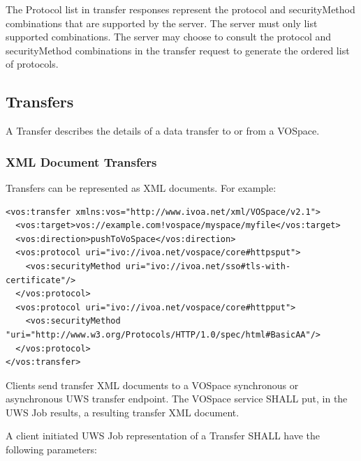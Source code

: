 \documentclass[11pt,a4paper]{ivoa}
\begin{document}
The Protocol list in transfer responses represent the protocol and securityMethod combinations that are supported by the server.  The server must only list supported combinations.  The server may choose to consult the protocol and securityMethod combinations in the transfer request to generate the ordered list of protocols.

\subsection{Transfers}
\label{subsec:transfers}
A Transfer describes the details of a data transfer to or from a VOSpace.

\subsubsection{XML Document Transfers}
\label{subsubsec:xml document transfers}

Transfers can be represented as XML documents.  For example:

\begin{verbatim}
<vos:transfer xmlns:vos="http://www.ivoa.net/xml/VOSpace/v2.1">
  <vos:target>vos://example.com!vospace/myspace/myfile</vos:target>
  <vos:direction>pushToVoSpace</vos:direction>
  <vos:protocol uri="ivo://ivoa.net/vospace/core#httpsput">
    <vos:securityMethod uri="ivo://ivoa.net/sso#tls-with-certificate"/>
  </vos:protocol>
  <vos:protocol uri="ivo://ivoa.net/vospace/core#httpput">
    <vos:securityMethod "uri="http://www.w3.org/Protocols/HTTP/1.0/spec/html#BasicAA"/>
  </vos:protocol>
</vos:transfer>
\end{verbatim}

Clients send transfer XML documents to a VOSpace synchronous or asynchronous UWS transfer endpoint.  The VOSpace service SHALL put, in the UWS Job results, a resulting transfer XML document.

A client initiated UWS Job representation of a Transfer SHALL have the following parameters:
\end{document}

